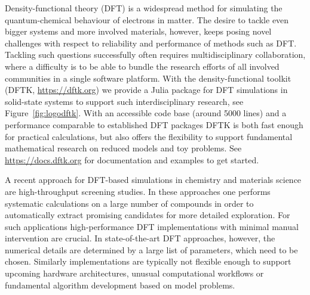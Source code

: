 \documentclass{juliacon}
\begin{document}


\maketitle

Density-functional theory (DFT) is a widespread method for simulating the
quantum-chemical behaviour of electrons in matter.
The desire to tackle even bigger systems and
more involved materials, however, keeps posing novel challenges with respect to
reliability and performance of methods such as DFT.
Tackling such questions successfully often requires
multidisciplinary collaboration,
where a difficulty is to be able to bundle the
research efforts of all involved communities in a single software platform.
With the density-functional toolkit (DFTK, \url{https://dftk.org})
we provide a Julia package for DFT simulations
in solid-state systems to support such interdisciplinary research,
see Figure~\ref{fig:logodftk}.
With an accessible code base (around 5000 lines)
and a performance comparable to established DFT packages
DFTK is both fast enough for practical calculations,
but also offers the flexibility to support fundamental mathematical research
on reduced models and toy problems.
See \url{https://docs.dftk.org} for documentation and examples to get started.
\vskip 6pt

A recent approach for DFT-based simulations
in chemistry and materials science are high-throughput screening studies.
In these approaches one performs systematic calculations on
a large number of compounds
in order to automatically extract
promising candidates for more detailed exploration.
For such applications high-performance
DFT implementations with minimal
manual intervention are crucial.
In state-of-the-art DFT approaches, however,
the numerical details are determined by a
large list of parameters, which need to be chosen.
Similarly implementations are typically not flexible enough
to support upcoming hardware architectures,
unusual computational workflows
or fundamental algorithm development
based on model problems.
\vskip 6pt
\end{document}
